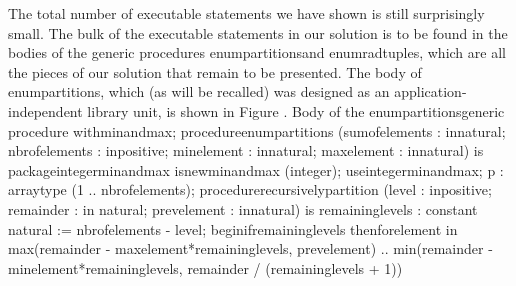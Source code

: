 \Endpara[]
\Para[]The total number of executable statements we have shown is
still surprisingly small. The bulk of the executable statements in
our solution is to be found in the bodies of the generic procedures
\tyxffmxmono[]enum\Symuns[]partitions\tyxffmxendmono[] and %
\tyxffmxmono[]enum\Symuns[]rad\Symuns[]tuples\tyxffmxendmono[], which
are all the pieces of our solution that remain to be presented. The
body of \tyxffmxmono[]enum\Symuns[]partitions\tyxffmxendmono[], which
(as will be recalled) was designed as an application-independent library
unit, is shown in Figure .
\FgBlock[]
\Parbox[]
Body of the %
\tyxffmxmono[]enum\Symuns[]partitions\tyxffmxendmono[] generic procedure%
\FgEndcap[]
\Comp[]\tyxtstxbf[]with\tyxtstxendbf[] min\Symuns[]and\Symuns[]max;
\tyxtstxbf[]procedure\tyxtstxendbf[] enum\Symuns[]partitions (sum\Symuns[]of\Symuns[]elements : %
\tyxtstxbf[]in\tyxtstxendbf[] natural;
                           nbr\Symuns[]of\Symuns[]elements : %
\tyxtstxbf[]in\tyxtstxendbf[] positive;
                           min\Symuns[]element     : %
\tyxtstxbf[]in\tyxtstxendbf[] natural;
                           max\Symuns[]element     : %
\tyxtstxbf[]in\tyxtstxendbf[] natural) \tyxtstxbf[]is%
\tyxtstxendbf[]
   \tyxtstxbf[]package\tyxtstxendbf[] integer\Symuns[]min\Symuns[]and\Symuns[]max %
\tyxtstxbf[]is\tyxtstxendbf[] \tyxtstxbf[]new\tyxtstxendbf[] min\Symuns[]and\Symuns[]max (integer);
   \tyxtstxbf[]use\tyxtstxendbf[]     integer\Symuns[]min\Symuns[]and\Symuns[]max;
   p : array\Symuns[]type (1 .. nbr\Symuns[]of\Symuns[]elements);
   \tyxtstxbf[]procedure\tyxtstxendbf[] recursively\Symuns[]partition (level        : %
\tyxtstxbf[]in\tyxtstxendbf[] positive;
                                    remainder    : \tyxtstxbf[]in%
\tyxtstxendbf[] natural;
                                    prev\Symuns[]element : %
\tyxtstxbf[]in\tyxtstxendbf[] natural) \tyxtstxbf[]is%
\tyxtstxendbf[]
      remaining\Symuns[]levels : \tyxtstxbf[]constant%
\tyxtstxendbf[] natural := nbr\Symuns[]of\Symuns[]elements - level;
   \tyxtstxbf[]begin\tyxtstxendbf[]
      \tyxtstxbf[]if\tyxtstxendbf[] remaining\Symuns[]levels  %
\tyxtstxbf[]then\tyxtstxendbf[]
         \tyxtstxbf[]for\tyxtstxendbf[] element \tyxtstxbf[]in%
\tyxtstxendbf[] max(remainder - max\Symuns[]element*remaining\Symuns[]levels,
                            prev\Symuns[]element) ..
                        min(remainder - min\Symuns[]element*remaining\Symuns[]levels,
                            remainder / (remaining\Symuns[]levels + 1)) %
